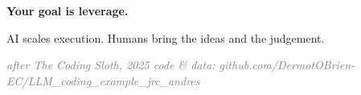 \documentclass[aspectratio=169,11pt]{beamer}
\begin{document}
{
\begin{frame}[plain]
  \vfill
  \begin{center}
    {\fontsize{52pt}{56pt}\selectfont\bfseries\textcolor{l3orange}{Your goal is leverage.}}
  \end{center}
  \vspace{20pt}
  \begin{center}
    {\Large\textcolor{gray!40!black}{AI scales execution. Humans bring the ideas and the judgement.}}
  \end{center}
  \vfill
  \begin{center}\small\itshape\textcolor{gray}{after The Coding Sloth, 2025 \quad\textperiodcentered\quad code \& data: github.com/DermotOBrien-EC/LLM\_coding\_example\_jrc\_andres}\end{center}
\end{frame}}
\end{document}
